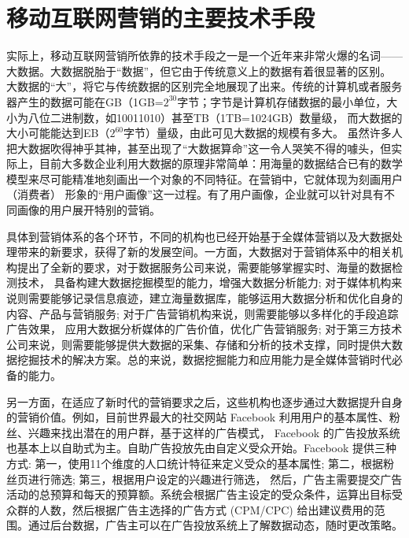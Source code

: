\documentclass[a4paper]{article}
\begin{document}
\section{移动互联网营销的主要技术手段}
	实际上，移动互联网营销所依靠的技术手段之一是一个近年来非常火爆的名词——大数据。大数据脱胎于“数据”，但它由于传统意义上的数据有着很显著的区别。
	大数据的“大”，将它与传统数据的区别完全地展现了出来。传统的计算机或者服务器产生的数据可能在GB（1GB=$2^{30}$字节；字节是计算机存储数据的最小单位，大小为八位二进制数，如10011010）甚至TB（1TB=1024GB）数量级，
	而大数据的大小可能能达到EB（$2^{60}$字节）量级，由此可见大数据的规模有多大。
	虽然许多人把大数据吹得神乎其神，甚至出现了“大数据算命”这一令人哭笑不得的噱头，但实际上，目前大多数企业利用大数据的原理非常简单：用海量的数据结合已有的数学模型来尽可能精准地刻画出一个对象的不同特征。在营销中，它就体现为刻画用户（消费者）
	形象的“用户画像”这一过程。有了用户画像，企业就可以针对具有不同画像的用户展开特别的营销。\par
	具体到营销体系的各个环节，不同的机构也已经开始基于全媒体营销以及大数据处理带来的新要求，获得了新的发展空间。一方面，大数据对于营销体系中的相关机构提出了全新的要求，对于数据服务公司来说，需要能够掌握实时、海量的数据检测技术，
	具备构建大数据挖掘模型的能力，增强大数据分析能力; 对于媒体机构来说则需要能够记录信息痕迹，建立海量数据库，能够运用大数据分析和优化自身的内容、产品与营销服务; 对于广告营销机构来说，则需要能够以多样化的手段追踪广告效果，
	应用大数据分析媒体的广告价值，优化广告营销服务; 对于第三方技术公司来说，则需要能够提供大数据的采集、存储和分析的技术支撑，同时提供大数据挖掘技术的解决方案。总的来说，数据挖掘能力和应用能力是全媒体营销时代必备的能力。\par
	另一方面，在适应了新时代的营销要求之后，这些机构也逐步通过大数据提升自身的营销价值。例如，目前世界最大的社交网站 Facebook 利用用户的基本属性、粉丝、兴趣来找出潜在的用户群，基于这样的广告模式，
	Facebook 的广告投放系统也基本上以自助式为主。自助广告投放先由自定义受众开始。Facebook 提供三种方式: 第一，使用11个维度的人口统计特征来定义受众的基本属性; 第二，根据粉丝页进行筛选; 第三，根据用户设定的兴趣进行筛选，
	然后，广告主需要提交广告活动的总预算和每天的预算额。系统会根据广告主设定的受众条件，运算出目标受众群的人数，然后根据广告主选择的广告方式 (CPM/CPC) 给出建议费用的范围。通过后台数据，广告主可以在广告投放系统上了解数据动态，随时更改策略。
	\cite{2}
\end{document}
